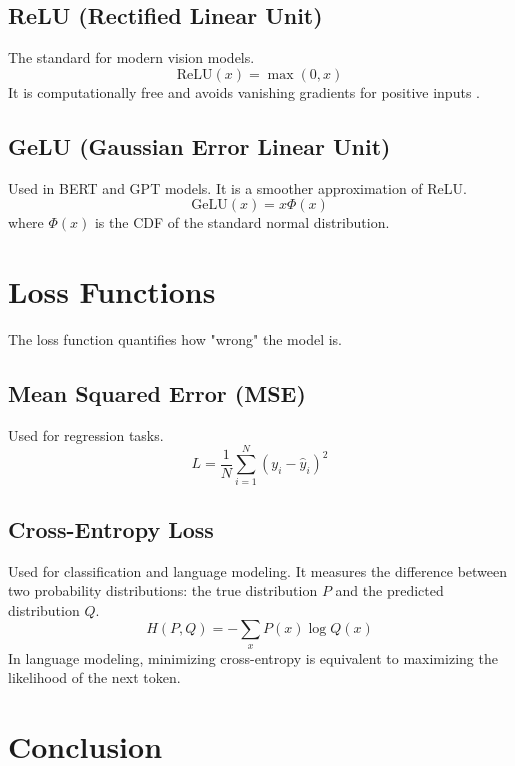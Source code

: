 \subsection{ReLU (Rectified Linear Unit)}
The standard for modern vision models.
\begin{equation}
    \text{ReLU}(x) = \max(0, x)
\end{equation}
It is computationally free and avoids vanishing gradients for positive inputs \cite{krizhevsky2012imagenet}.

\subsection{GeLU (Gaussian Error Linear Unit)}
Used in BERT and GPT models. It is a smoother approximation of ReLU.
\begin{equation}
    \text{GeLU}(x) = x \Phi(x)
\end{equation}
where $\Phi(x)$ is the CDF of the standard normal distribution.

\section{Loss Functions}

The loss function quantifies how "wrong" the model is.

\subsection{Mean Squared Error (MSE)}
Used for regression tasks.
\begin{equation}
    L = \frac{1}{N} \sum_{i=1}^{N} (y_i - \hat{y}_i)^2
\end{equation}

\subsection{Cross-Entropy Loss}
Used for classification and language modeling. It measures the difference between two probability distributions: the true distribution $P$ and the predicted distribution $Q$.
\begin{equation}
    H(P, Q) = - \sum_{x} P(x) \log Q(x)
\end{equation}
In language modeling, minimizing cross-entropy is equivalent to maximizing the likelihood of the next token.

\section{Conclusion}

